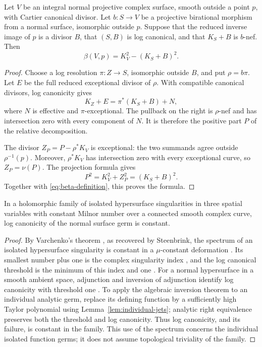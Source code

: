 \begin{lemma}
\label{lem:projective-local-square}
Let $V$ be an integral normal projective complex surface, smooth outside
a point $p$, with Cartier canonical divisor.  Let $b:S\to V$ be a
projective birational morphism from a normal surface, isomorphic outside
$p$.  Suppose that the reduced inverse image of $p$ is a divisor $B$,
that $(S,B)$ is log canonical, and that $K_S+B$ is $b$-nef.  Then
\begin{equation}\label{eq:projective-local-square}
 \beta(V,p)=K_V^2-(K_S+B)^2.
\end{equation}
\end{lemma}

\begin{proof}
Choose a log resolution $\pi:Z\to S$, isomorphic outside $B$, and put
$\rho=b\pi$.  Let $E$ be the full reduced exceptional divisor of $\rho$.
With compatible canonical divisors, log canonicity gives
\[
 K_Z+E=\pi^*(K_S+B)+N,
\]
where $N$ is effective and $\pi$-exceptional.  The pullback on the right
is $\rho$-nef and has intersection zero with every component of $N$.
It is therefore the positive part $P$ of the relative decomposition.

The divisor $Z_P=P-\rho^*K_V$ is exceptional: the two summands agree
outside $\rho^{-1}(p)$.  Moreover, $\rho^*K_V$ has intersection zero with
every exceptional curve, so $Z_P=\nu(P)$.  The projection formula gives
\[
 P^2=K_V^2+Z_P^2=(K_S+B)^2.
\]
Together with \eqref{eq:beta-definition}, this proves the formula.
\end{proof}

\begin{lemma}\label{lem:lc-persistence}
In a holomorphic family of isolated hypersurface singularities in three
spatial variables with constant Milnor number over a connected smooth
complex curve, log
canonicity of the normal surface germ is constant.
\end{lemma}
\begin{proof}
By Varchenko's theorem \cite{Varchenko1982}, as recovered by
Steenbrink, the spectrum of an isolated hypersurface singularity
is constant in a $\mu$-constant deformation
\cite[Theorem~2.8]{Steenbrink1985}.  Its smallest number plus one is the
complex singularity index \cite[Theorem~2.11]{Steenbrink1985}, and the
log canonical threshold is the minimum of this index and one
\cite[Theorem~9.5]{Kollar1997Pairs}.  For a normal hypersurface in a smooth
ambient space, adjunction and inversion of adjunction identify log
canonicity with threshold one \cite{Kawakita2007}.  To apply the algebraic
inversion theorem to an individual analytic germ, replace its defining
function by a sufficiently high Taylor polynomial using
Lemma~\ref{lem:individual-jets}; analytic right equivalence preserves both
the threshold and log canonicity.  Thus log canonicity, and its failure,
is constant in the family.  This use of the spectrum concerns the
individual isolated function germs; it does not assume topological
triviality of the family.
\end{proof}
